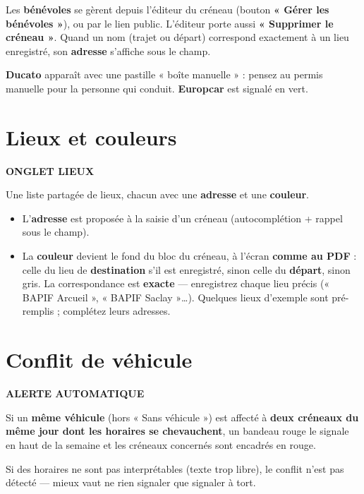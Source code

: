 \documentclass[11pt,a4paper]{article}
\newcommand{\eyebrow}[1]{{\sffamily\fontfamily{qag}\selectfont\bfseries\small\color{accentdark}\MakeUppercase{#1}}\par\vspace{2pt}}
\begin{document}
Les \textbf{bénévoles} se gèrent depuis l'éditeur du créneau (bouton \textbf{« Gérer les
bénévoles »}), ou par le lien public. L'éditeur porte aussi \textbf{« Supprimer le créneau »}.
Quand un nom (trajet ou départ) correspond exactement à un lieu enregistré, son
\textbf{adresse} s'affiche sous le champ.

\begin{notebox}
\textbf{Ducato} apparaît avec une pastille « boîte manuelle » : pensez au permis manuelle pour
la personne qui conduit. \textbf{Europcar} est signalé en vert.
\end{notebox}

\section{Lieux et couleurs}
\eyebrow{Onglet Lieux}

Une liste partagée de lieux, chacun avec une \textbf{adresse} et une \textbf{couleur}.

\begin{itemize}
  \item L'\textbf{adresse} est proposée à la saisie d'un créneau (autocomplétion + rappel sous
  le champ).
  \item La \textbf{couleur} devient le fond du bloc du créneau, à l'écran \textbf{comme au PDF} :
  celle du lieu de \textbf{destination} s'il est enregistré, sinon celle du \textbf{départ},
  sinon gris. La correspondance est \textbf{exacte} — enregistrez chaque lieu précis
  (« BAPIF Arcueil », « BAPIF Saclay »…). Quelques lieux d'exemple sont pré-remplis ;
  complétez leurs adresses.
\end{itemize}

\section{Conflit de véhicule}
\eyebrow{Alerte automatique}

Si un \textbf{même véhicule} (hors « Sans véhicule ») est affecté à \textbf{deux créneaux du
même jour dont les horaires se chevauchent}, un bandeau rouge le signale en haut de la semaine
et les créneaux concernés sont encadrés en rouge.

\vspace{4pt}
Si des horaires ne sont pas interprétables (texte trop libre), le conflit n'est pas détecté —
mieux vaut ne rien signaler que signaler à tort.
\end{document}
